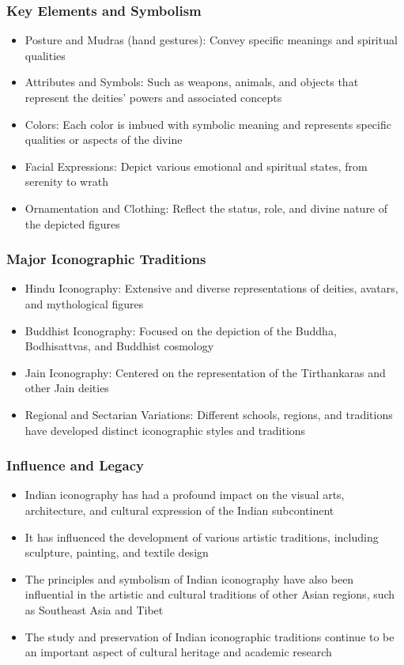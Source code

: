 \begin{frame}[fragile]\frametitle{Key Elements and Symbolism}
    \begin{itemize}
        \item Posture and Mudras (hand gestures): Convey specific meanings and spiritual qualities
        \item Attributes and Symbols: Such as weapons, animals, and objects that represent the deities' powers and associated concepts
        \item Colors: Each color is imbued with symbolic meaning and represents specific qualities or aspects of the divine
        \item Facial Expressions: Depict various emotional and spiritual states, from serenity to wrath
        \item Ornamentation and Clothing: Reflect the status, role, and divine nature of the depicted figures
    \end{itemize}
\end{frame}

\begin{frame}[fragile]\frametitle{Major Iconographic Traditions}
    \begin{itemize}
        \item Hindu Iconography: Extensive and diverse representations of deities, avatars, and mythological figures
        \item Buddhist Iconography: Focused on the depiction of the Buddha, Bodhisattvas, and Buddhist cosmology
        \item Jain Iconography: Centered on the representation of the Tirthankaras and other Jain deities
        \item Regional and Sectarian Variations: Different schools, regions, and traditions have developed distinct iconographic styles and traditions
    \end{itemize}
\end{frame}

\begin{frame}[fragile]\frametitle{Influence and Legacy}
    \begin{itemize}
        \item Indian iconography has had a profound impact on the visual arts, architecture, and cultural expression of the Indian subcontinent
        \item It has influenced the development of various artistic traditions, including sculpture, painting, and textile design
        \item The principles and symbolism of Indian iconography have also been influential in the artistic and cultural traditions of other Asian regions, such as Southeast Asia and Tibet
        \item The study and preservation of Indian iconographic traditions continue to be an important aspect of cultural heritage and academic research
    \end{itemize}
\end{frame}

